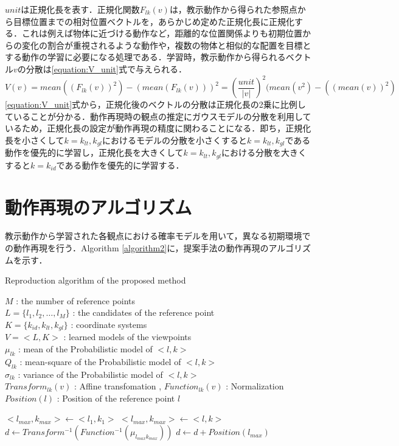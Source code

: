 $unit$は正規化長を表す．正規化関数$F_{lk}(v)$は，教示動作から得られた参照点から目標位置までの相対位置ベクトルを，あらかじめ定めた正規化長に正規化する．これは例えば物体に近づける動作など，距離的な位置関係よりも初期位置からの変化の割合が重視されるような動作や，複数の物体と相似的な配置を目標とする動作の学習に必要になる処理である．学習時，教示動作から得られるベクトル$v$の分散は\ref{equation:V_unit}式で与えられる．
\begin{equation}
	\label{equation:V_unit}
	V(v) = mean((F_{lk}(v))^{2}) - (mean(F_{lk}(v)))^{2} = \left(\frac{unit}{|v|}\right)^{2}(mean(v^{2}) - ((mean(v))^{2})
\end{equation}
\ref{equation:V_unit}式から，正規化後のベクトルの分散は正規化長の2乗に比例していることが分かる．動作再現時の観点の推定にガウスモデルの分散を利用しているため，正規化長の設定が動作再現の精度に関わることになる．即ち，正規化長を小さくして$k=k_{lt} , k_{gl}$におけるモデルの分散を小さくすると$k=k_{lt} , k_{gl}$である動作を優先的に学習し，正規化長を大きくして$k=k_{lt} , k_{gl}$における分散を大きくすると$k=k_{id}$である動作を優先的に学習する．


\section{動作再現のアルゴリズム}

教示動作から学習された各観点における確率モデルを用いて，異なる初期環境での動作再現を行う．Algorithm \ref{algorithm2}に，提案手法の動作再現のアルゴリズムを示す．
	\begin{algorithm}[h]
		\caption{ Reproduction algorithm of the proposed method}
		\label{algorithm2}
		\begin{algorithmic}
			\REQUIRE
				$M$ : the number of reference points \\ 
				$L = \{l_{1} , l_{2} , \ldots , l_{M}\}$ : the candidates of the reference point \\
				$K = \{k_{id} , k_{lt} , k_{gl}\}$ : coordinate systems \\
				$V = <L , K>$ : learned models of the viewpoints \\
				$μ_{lk}$ : mean of the Probabilistic model of $<l , k>$ \\
				$Q_{lk}$ : mean-square of the Probabilistic model of $<l , k>$ \\
				$σ_{lk}$ : variance of the Probabilistic model of $<l , k>$ \\
				$Transform_{lk}(v)$ : Affine transfomation , 
				$Function_{lk}(v)$ : Normalization \\
				$Position(l)$ : Position of the reference point $l$
		\end{algorithmic}
		\begin{algorithmic}[1]
			\STATE $<l_{max} , k_{max}> \leftarrow <l_{1} , k_{1}>$
			\FOR{all $<l , k>∈V$}
				\IF{$σ_{lk} < σ_{l_{max}k_{max}}$}
					\STATE $<l_{max} , k_{max}> \leftarrow <l , k>$
				\ENDIF
			\ENDFOR
			\STATE $d \leftarrow Transform^{-1}(Function^{-1}(μ_{l_{max}k_{max}}))$
			\STATE $d \leftarrow d + Position(l_{max})$
		\end{algorithmic}
	\end{algorithm}


